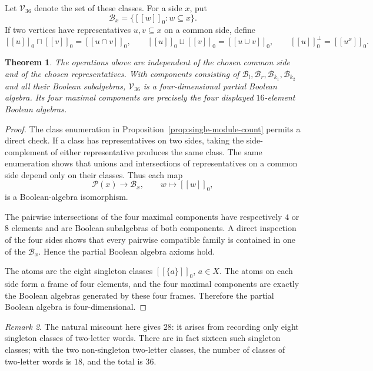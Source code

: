 \documentclass{article}   	%
\theoremstyle{plain}
\newtheorem{theorem}{Theorem}[section]
\theoremstyle{definition}
\theoremstyle{remark}
\newtheorem{remark}[theorem]{Remark}
\begin{document}
Let $\mathcal V_{36}$ denote the set of these classes.  For a side $x$, put
\[
\mathcal B_x=\{[[w]]_0:w\subseteq x\}.
\]
If two vertices have representatives $u,v\subseteq x$ on a common side, define
\[
[[u]]_0\sqcap[[v]]_0=[[u\cap v]]_0,
\qquad
[[u]]_0\sqcup[[v]]_0=[[u\cup v]]_0,
\qquad
[[u]]_0^\perp=[[u^x]]_0.
\]

\begin{theorem}
\label{thm:single-module-pba}
The operations above are independent of the chosen common side and of the
chosen representatives.  With components consisting of
$\mathcal B_l,\mathcal B_r,\mathcal B_{k_1},\mathcal B_{k_2}$ and all their
Boolean subalgebras, $\mathcal V_{36}$ is a four-dimensional partial Boolean
algebra.  Its four maximal components are precisely the four displayed
$16$-element Boolean algebras.
\end{theorem}

\begin{proof}
The class enumeration in Proposition~\ref{prop:single-module-count} permits a
direct check.  If a class has representatives on two sides, taking the
side-complement of either representative produces the same class.  The same
enumeration shows that unions and intersections of representatives on a common
side depend only on their classes.  Thus each map
\[
\mathcal P(x)\longrightarrow\mathcal B_x,
\qquad w\longmapsto[[w]]_0,
\]
is a Boolean-algebra isomorphism.

The pairwise intersections of the four maximal components have respectively
$4$ or $8$ elements and are Boolean subalgebras of both components.  A direct
inspection of the four sides shows that every pairwise compatible family is
contained in one of the $\mathcal B_x$.  Hence the partial Boolean algebra
axioms hold.

The atoms are the eight singleton classes $[[\{a\}]]_0$, $a\in X$.  The atoms
on each side form a frame of four elements, and the four maximal components are
exactly the Boolean algebras generated by these four frames.  Therefore the
partial Boolean algebra is four-dimensional.
\end{proof}

\begin{remark}
The natural miscount here gives $28$: it arises from recording only eight
singleton classes of two-letter words.  There are in fact sixteen such singleton
classes; with the two non-singleton two-letter classes, the number of classes of
two-letter words is $18$, and the total is $36$.
\end{remark}
\end{document}
